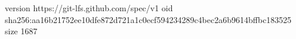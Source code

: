 version https://git-lfs.github.com/spec/v1
oid sha256:aa16b21752ee10dfe872d721a1c0ecf594234289c4bec2a6b9614bffbc183525
size 1687
